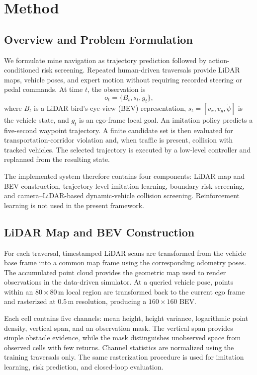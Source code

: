 \section{Method}
\label{sec:method}

\subsection{Overview and Problem Formulation}

We formulate mine navigation as trajectory prediction followed by action-conditioned risk screening. Repeated human-driven traversals provide LiDAR maps, vehicle poses, and expert motion without requiring recorded steering or pedal commands. At time $t$, the observation is
\begin{equation}
o_t=\{B_t,s_t,g_t\},
\end{equation}
where $B_t$ is a LiDAR bird's-eye-view (BEV) representation, $s_t=[v_x,v_y,\dot{\psi}]$ is the vehicle state, and $g_t$ is an ego-frame local goal. An imitation policy predicts a five-second waypoint trajectory. A finite candidate set is then evaluated for transportation-corridor violation and, when traffic is present, collision with tracked vehicles. The selected trajectory is executed by a low-level controller and replanned from the resulting state.

The implemented system therefore contains four components: LiDAR map and BEV construction, trajectory-level imitation learning, boundary-risk screening, and camera--LiDAR-based dynamic-vehicle collision screening. Reinforcement learning is not used in the present framework.

\subsection{LiDAR Map and BEV Construction}

For each traversal, timestamped LiDAR scans are transformed from the vehicle base frame into a common map frame using the corresponding odometry poses. The accumulated point cloud provides the geometric map used to render observations in the data-driven simulator. At a queried vehicle pose, points within an $80\times80\,\mathrm{m}$ local region are transformed back to the current ego frame and rasterized at $0.5\,\mathrm{m}$ resolution, producing a $160\times160$ BEV.

Each cell contains five channels: mean height, height variance, logarithmic point density, vertical span, and an observation mask. The vertical span provides simple obstacle evidence, while the mask distinguishes unobserved space from observed cells with few returns. Channel statistics are normalized using the training traversals only. The same rasterization procedure is used for imitation learning, risk prediction, and closed-loop evaluation.

